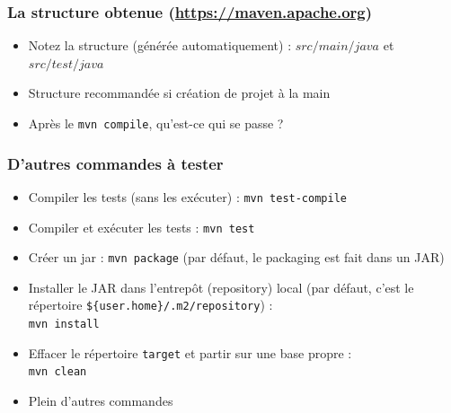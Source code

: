 \documentclass{beamer}
\begin{document}
\begin{frame}[fragile]
  \frametitle{La structure obtenue {\normalsize(\url{https://maven.apache.org})}}
  \begin{itemize}
    \vspace{4cm}
  \item Notez la structure (générée automatiquement) : $src/main/java$
    et $src/test/java$
  \item Structure recommandée si création de projet à la main    
  \item Après le \texttt{mvn compile}, qu'est-ce qui se passe ?

\end{itemize}  
\end{frame}

\begin{frame}[fragile]
  \frametitle{D'autres commandes à tester}
  \begin{itemize}
  \item Compiler les tests (sans les exécuter) : \texttt{mvn test-compile}
  \item Compiler et exécuter les tests : \texttt{mvn test}
  \item Créer un jar : \texttt{mvn package} (par défaut, le packaging
    est fait dans un JAR)
  \item Installer le JAR dans l'entrepôt (repository) local (par défaut,
    c'est le répertoire \texttt{\$\{user.home\}/.m2/repository}) :\\ 
    \texttt{mvn install}
  \item Effacer le répertoire \texttt{target} et partir sur une base
    propre :\\ \texttt{mvn clean}
  \item Plein d'autres commandes 
    
  \end{itemize}  
\end{frame}
\end{document}
